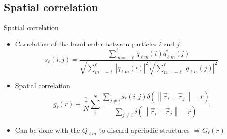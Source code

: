 \subsection{Spatial correlation}

\begin{frame}{Spatial correlation}
	\begin{itemize}
		\item Correlation of the bond order between particles $i$ and $j$
		\[ s_\ell(i,j) = \frac{
			\sum_{m=-\ell}^{\ell} q_{\ell m}(i) q_{\ell m}^{*}(j)
		}{
			\sqrt{\sum_{m=-\ell}^{\ell} |q_{\ell m}(i)|^2} \sqrt{\sum_{m=-\ell}^{\ell} |q_{\ell m}(j)|^2}
		}\]
		\item Spatial correlation
		\[ g_\ell(r) \equiv \frac{1}{N}\sum_i^N \frac{
			\sum_{j \neq i}{ s_\ell(i,j) \delta\left(\left\|\vec{r}_i-\vec{r}_j \right\| - r \right)}
		}{
		\sum_{j \neq i}{\delta\left(\left\|\vec{r}_i-\vec{r}_j \right\| - r \right)}
		} \]
		\item Can be done with the $Q_{\ell m}$ to discard aperiodic structures $\Longrightarrow G_\ell(r)$
	\end{itemize}
\end{frame}

